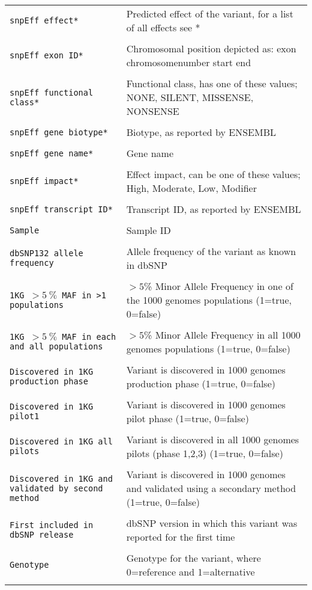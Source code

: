 \documentclass[a4paper,12pt]{article}
\begin{document}
\begin{center}
\begin{longtable}{p{5cm} p{8cm}}
	\tt{snpEff effect*} & Predicted effect of the variant, for a list of all effects see * \\\\
	\tt{snpEff exon ID*} & Chromosomal position depicted as: exon chromosomenumber start end \\\\
	\tt{snpEff functional class*} & Functional class, has one of these values; NONE, SILENT, MISSENSE, NONSENSE \\\\
	\tt{snpEff gene biotype*} & Biotype, as reported by ENSEMBL \\\\
	\tt{snpEff gene name*} & Gene name \\\\
	\tt{snpEff impact*} & Effect impact, can be one of these values; High, Moderate, Low, Modifier \\\\
	\tt{snpEff transcript ID*} & Transcript ID, as reported by ENSEMBL \\\\
	\tt{Sample} & Sample ID \\\\
	\tt{dbSNP132 allele frequency} & Allele frequency of the variant as known in dbSNP \\\\
	\tt{1KG $>5~\%$ MAF in >1 populations} & $>5$\% Minor Allele Frequency in one of the 1000 genomes populations (1=true, 0=false) \\\\
	\tt{1KG $>5~\%$ MAF in each and all populations} & $>5$\% Minor Allele Frequency in all 1000 genomes populations (1=true, 0=false) \\\\
	\tt{Discovered in 1KG production phase} & Variant is discovered in 1000 genomes production phase (1=true, 0=false) \\\\
	\tt{Discovered in 1KG pilot1} & Variant is discovered in 1000 genomes pilot phase (1=true, 0=false) \\\\
	\tt{Discovered in 1KG all pilots} & Variant is discovered in all 1000 genomes pilots (phase 1,2,3) (1=true, 0=false) \\\\
	\tt{Discovered in 1KG and validated by second method} & Variant is discovered in 1000 genomes and validated using a secondary method (1=true, 0=false) \\\\
	\tt{First included in dbSNP release} & dbSNP version in which this variant was reported for the first time \\\\
	\tt{Genotype} & Genotype for the variant, where 0=reference and 1=alternative \\\\	\end{longtable}
\end{center}
\end{document}
